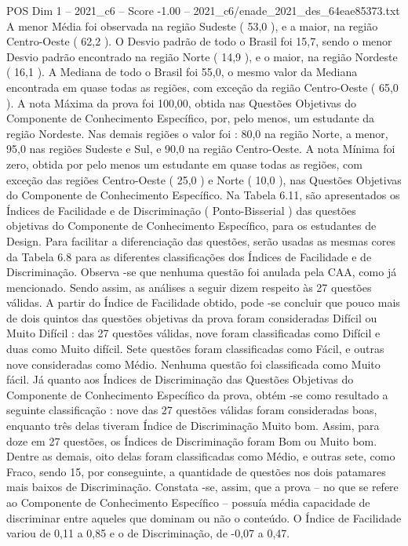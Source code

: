 \begin{textsample}{POS Dim 1 – 2021\_c6 – Score -1.00 – 2021\_c6/enade\_2021\_des\_64eae85373.txt}
A menor Média foi observada na região Sudeste ( 53,0 ), e a maior, na região Centro-Oeste ( 62,2 ).
O Desvio padrão de todo o Brasil foi 15,7, sendo o menor Desvio padrão encontrado na região Norte ( 14,9 ), e o maior, na região Nordeste ( 16,1 ).
A Mediana de todo o Brasil foi 55,0, o mesmo valor da Mediana encontrada em quase todas as regiões, com exceção da região Centro-Oeste ( 65,0 ).
A nota Máxima da prova foi 100,00, obtida nas Questões Objetivas do Componente de Conhecimento Específico, por, pelo menos, um estudante da região Nordeste.
Nas demais regiões o valor foi : 80,0 na região Norte, a menor, 95,0 nas regiões Sudeste e Sul, e 90,0 na região Centro-Oeste.
A nota Mínima foi zero, obtida por pelo menos um estudante em quase todas as regiões, com exceção das regiões Centro-Oeste ( 25,0 ) e Norte ( 10,0 ), nas Questões Objetivas do Componente de Conhecimento Específico.
Na Tabela 6.11, são apresentados os Índices de Facilidade e de Discriminação ( Ponto-Bisserial ) das questões objetivas do Componente de Conhecimento Específico, para os estudantes de Design.
Para facilitar a diferenciação das questões, serão usadas as mesmas cores da Tabela 6.8 para as diferentes classificações dos Índices de Facilidade e de Discriminação.
Observa -se que nenhuma questão foi anulada pela CAA, como já mencionado.
Sendo assim, as análises a seguir dizem respeito às 27 questões válidas.
A partir do Índice de Facilidade obtido, pode -se concluir que pouco mais de dois quintos das questões objetivas da prova foram consideradas Difícil ou Muito Difícil : das 27 questões válidas, nove foram classificadas como Difícil e duas como Muito difícil.
Sete questões foram classificadas como Fácil, e outras nove consideradas como Médio.
Nenhuma questão foi classificada como Muito fácil.
Já quanto aos Índices de Discriminação das Questões Objetivas do Componente de Conhecimento Específico da prova, obtém -se como resultado a seguinte classificação : nove das 27 questões válidas foram consideradas boas, enquanto três delas tiveram Índice de Discriminação Muito bom.
Assim, para doze em 27 questões, os Índices de Discriminação foram Bom ou Muito bom.
Dentre as demais, oito delas foram classificadas como Médio, e outras sete, como Fraco, sendo 15, por conseguinte, a quantidade de questões nos dois patamares mais baixos de Discriminação.
Constata -se, assim, que a prova – no que se refere ao Componente de Conhecimento Específico – possuía média capacidade de discriminar entre aqueles que dominam ou não o conteúdo.
O Índice de Facilidade variou de 0,11 a 0,85 e o de Discriminação, de -0,07 a 0,47.

\end{textsample}
